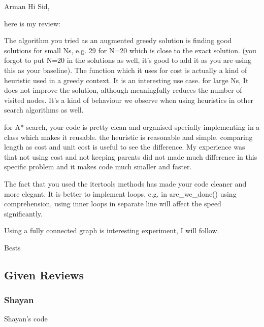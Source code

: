 \begin{tcolorbox}[colback=green!5!white,colframe=green!75!black,code={\singlespacing}]
  Arman
  \tcblower
Hi Sid,

here is my review:

The algorithm you tried as an augmented greedy solution is finding good solutions for small Ns, e.g. 29 for N=20 which is close to the exact solution. (you forgot to put N=20 in the solutions as well, it's good to add it as you are using this as your baseline). The function which it uses for cost is actually a kind of heuristic used in a greedy context. It is an interesting use case. for large Ns, It does not improve the solution, although meaningfully reduces the number of visited nodes. It's a kind of behaviour we observe when using heuristics in other search algorithms as well.

for A* search, your code is pretty clean and organised  specially implementing in a class which makes it reusable. the heuristic is reasonable and simple. comparing length as cost and unit cost is useful to see the difference. My experience was that not using cost and not keeping parents did not made much difference in this specific problem and it makes code much smaller and faster.

The fact that you used the itertools methods has made your code cleaner and more elegant. It is better to implement loops, e.g. in are\_we\_done() using comprehension, using inner loops in separate line will affect the speed significantly.

Using a fully connected graph is interesting experiment, I will follow.

Bests
\end{tcolorbox}

\subsection{Given Reviews}

\subsubsection{Shayan}

Shayan's code


